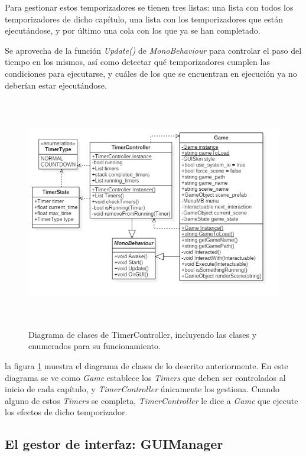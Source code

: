 Para gestionar estos temporizadores se tienen tres listas:  una lista con todos los temporizadores de dicho capítulo, una lista con los temporizadores que están ejecutándose, y por último una cola con los que ya se han completado.

Se aprovecha de la función \textit{Update()} de \textit{MonoBehaviour} para controlar el paso del tiempo en los mismos, así como detectar qué temporizadores cumplen las condiciones para ejecutarse, y cuáles de los que se encuentran en ejecución ya no deberían estar ejecutándose.

\begin{figure}[h!]
	\centerline{\includegraphics[height=4in]{figures/it2/TimerController.png}}
	\caption[TimerController - Versión Final]{Diagrama de clases de TimerController, incluyendo las clases y enumerados para su funcionamiento.}
	\label{timercontrollerit2}
\end{figure}

la figura \ref{timercontrollerit2} muestra el diagrama de clases de lo descrito anteriormente. En este diagrama se ve como \textit{Game} establece los \textit{Timers} que deben ser controlados al inicio de cada capítulo, y \textit{TimerController} únicamente los gestiona. Cuando alguno de estos \textit{Timers} se completa, \textit{TimerController} le dice a \textit{Game} que ejecute los efectos de dicho temporizador.

\newpage

\subsection{El gestor de interfaz: GUIManager}

